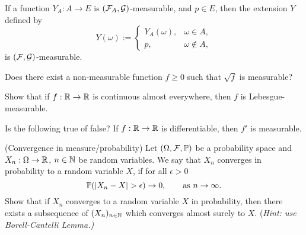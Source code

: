 \begin{problem}
    If a function $Y_A : A \to E$ is $(\mathcal F_A, \mathcal G)$-measurable, and $p \in E$, then
the extension $Y$ defined by
\begin{equation*}
    Y (\omega) := \begin{cases}
Y_A(\omega),  &\omega \in A,\\
p, &\omega\notin A,
    \end{cases}
\end{equation*}
is $(\mathcal F, \mathcal G)$-measurable.
\end{problem}

\begin{problem}
    Does there exist a non-measurable function $f \geq 0$ such that
    $\sqrt{f}$ is measurable?
\end{problem}

\begin{problem}
    Show that if $f:\mathbb R\to \mathbb R$ is continuous almost everywhere, then $f$ is Lebesgue-measurable.
\end{problem}

\begin{problem}
    Is the following true of false?
    If $f : \mathbb R \to \mathbb R$ is differentiable, then $f'$ is measurable.
\end{problem}

\begin{problem}(Convergence in measure/probability) Let $(\Omega,\mathcal F,\mathbb P)$ be a probability space and $X_n:\Omega \to \mathbb R$, $n\in \mathbb N$ be random variables. We say that $X_n$ converges in probability to a random variable $X$, if for all $\epsilon>0$
    \begin{equation*}
        \bbP(|X_n-X|>\epsilon) \to 0,\qquad\text{as $n\to \infty$}.
    \end{equation*}  
Show that if $X_n$ converges to a random variable $X$ in probability, then there exists a subsequence of $(X_n)_{n\in \mathbb N}$ which converges almost surely to $X$. (\emph{Hint: use Borell-Cantelli Lemma.)}
\end{problem}